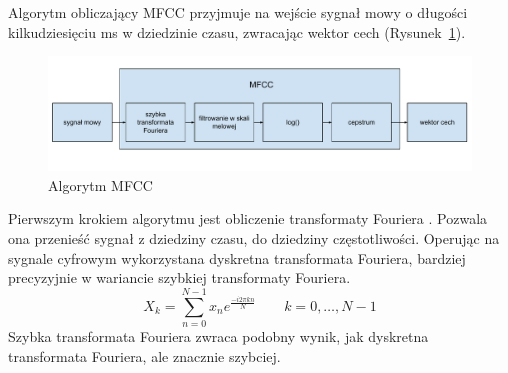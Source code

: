 \documentclass[a4paper,12pt,twoside,openany]{report}
\newcommand{\Rys}[1]{(Rysunek~\ref{#1})}
\begin{document}
Algorytm obliczający MFCC przyjmuje na wejście sygnał mowy o długości kilkudziesięciu ms w dziedzinie czasu,
zwracając wektor cech \Rys{rys:mgcc:schemat}.
\begin{figure}[h]
	\centering
	\includegraphics[width=\textwidth]{mfcc-schemat}
	\caption{Algorytm MFCC}
	\label{rys:mgcc:schemat}
\end{figure}

Pierwszym krokiem algorytmu jest obliczenie transformaty Fouriera \cite{Steidl2009}. 
Pozwala ona przenieść sygnał z dziedziny czasu, do dziedziny częstotliwości. 
Operując na sygnale cyfrowym wykorzystana dyskretna transformata Fouriera,
bardziej precyzyjnie w wariancie szybkiej transformaty Fouriera. 
\begin{equation}
	X_{k}=\sum _{n=0}^{N-1}x_{n}e^{\frac{-i2\pi kn}{N}}\qquad k=0,\dots ,N-1
\end{equation}
Szybka transformata Fouriera zwraca podobny wynik, jak dyskretna transformata Fouriera,
ale znacznie szybciej.
\end{document}
